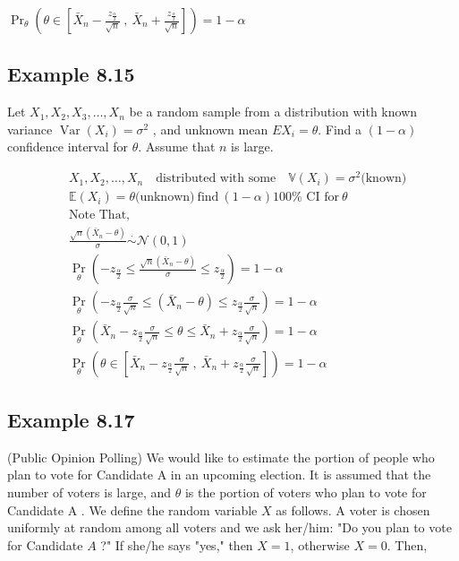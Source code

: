 \documentclass[12pt,a4paper]{article}
\begin{document}
 \(\Pr_{\theta}\left( \theta \in\left[ \bar{X}_{n}-\frac{z_{\frac{\alpha}{2}}}{\sqrt{n}} \ ,\  \bar{X}_{n}+\frac{z_{\frac{\alpha}{2}}}{\sqrt{n}} \right] \right) =1-\alpha\)  
 
 \subsection*{Example 8.15}
 Let \(X_1, X_2, X_3, \ldots, X_n\) be a random sample from a distribution with known variance \(\operatorname{Var}\left(X_i\right)=\sigma^2\) , and unknown mean \(E X_i=\theta\). Find a \((1-\alpha)\) confidence interval for \(\theta\). Assume that \(n\) is large.
 
 \begin{align*}
     &X_{1},X_{2},\ldots,X_{n} \quad \text{distributed with some} \quad \mathbb{V}(X_{i})=\sigma^2 \text{(known)} \\
    &\mathbb{E}(X_{i})= \theta \text{(unknown)} \ \text{find} \
    (1-\alpha) 100\% \text{ CI for} \ \theta \\
    &\text{Note That,}\\
    &\frac{\sqrt{n}(\bar{X}_{n}-\theta)}{\sigma} \overset{\cdot}{\sim} \mathcal{N}(0,1)\\ 
    &\Pr_{\theta}\left( -z_{\frac{\alpha}{2}} \leq \frac{\sqrt{n}(\bar{X}_n - \theta)}{\sigma} \leq z_{\frac{\alpha}{2}} \right) = 1-\alpha\\
    &\Pr_{\theta}\left( -z_{\frac{\alpha}{2}}\frac{\sigma}{\sqrt{n}} \leq (\bar{X}_n - \theta) \leq z_{\frac{\alpha}{2}}\frac{\sigma}{\sqrt{n}} \right) = 1-\alpha\\
    &\Pr_{\theta}\left(\bar{X}_{n} - z_{\frac{\alpha}{2}}\frac{\sigma}{\sqrt{n}} \leq \theta \leq \bar{X}_{n}+z_{\frac{\alpha}{2}}\frac{\sigma}{\sqrt{n}} \right) = 1-\alpha\\
    &\Pr_{\theta}\left( \theta \in \left[ \bar{X}_{n} - z_{\frac{\alpha}{2}}\frac{\sigma}{\sqrt{n}} \ , \ \bar{X}_{n}+z_{\frac{\alpha}{2}}\frac{\sigma}{\sqrt{n}}  \right]  \right) =1 - \alpha
\end{align*}

\subsection*{Example 8.17}
 (Public Opinion Polling) We would like to estimate the portion of people who plan to vote for Candidate A in an upcoming election. It is assumed that the number of voters is large, and \(\theta\) is the portion of voters who plan to vote for Candidate A . We define the random variable \(X\) as follows. A voter is chosen uniformly at random among all voters and we ask her/him: "Do you plan to vote for Candidate \(A\) ?" If she/he says "yes," then \(X=1\), otherwise \(X=0\). Then,
\end{document}
